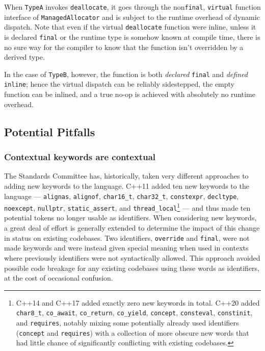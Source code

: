 {\noindent When \lstinline!TypeA! invokes \lstinline!deallocate!, it goes through the
non\lstinline!final!, \lstinline!virtual! function interface of
\lstinline!ManagedAllocator! and is subject to the runtime overhead of
dynamic dispatch. Note that even if the virtual \lstinline!deallocate!
function were inline, unless it is declared \lstinline!final! or the
runtime type is somehow known at compile time, there is no sure way for
the compiler to know that the function isn't overridden by a derived
type.

In the case of \lstinline!TypeB!, however, the function is both
\emph{declared} \lstinline!final! and \emph{defined} \lstinline!inline!; hence
the virtual dispatch can be reliably sidestepped, the empty function can
be inlined, and a true no-op is achieved with absolutely no runtime
overhead.

\subsection[Potential Pitfalls]{Potential Pitfalls}\label{potential-pitfalls-final}

\subsubsection[Contextual keywords are contextual]{Contextual keywords are contextual}\label{contextual-keywords-are-contextual}

The Standards Committee has, historically, taken very different
approaches to adding new keywords to the language. C++11 added ten new
keywords to the language --- \lstinline!alignas!, \lstinline!alignof!,
\lstinline!char16_t!, \lstinline!char32_t!, \lstinline!constexpr!,
\lstinline!decltype!, \lstinline!noexcept!, \lstinline!nullptr!,
\lstinline!static_assert!, and
\lstinline!thread_local!{\cprotect\footnote{C++14 and C++17 added exactly
zero new keywords in total. C++20 added \lstinline!char8_t!,
\lstinline!co_await!, \lstinline!co_return!, \lstinline!co_yield!,
\lstinline!concept!, \lstinline!consteval!, \lstinline!constinit!, and
\lstinline!requires!, notably mixing some potentially already used
identifiers (\lstinline!concept! and \lstinline!requires!) with a collection
of more obscure new words that had little chance of significantly
  conflicting with existing codebases.}} --- and thus made ten potential
tokens no longer usable as identifiers. When considering new keywords, a
great deal of effort is generally extended to determine the impact of
this change in status on existing codebases. Two identifiers,
\lstinline!override! and \lstinline!final!, were not made keywords and were
instead given special meaning when used in contexts where previously
identifiers were not syntactically allowed. This approach avoided
possible code breakage for any existing codebases using these words as
identifiers, at the cost of occasional confusion.

}
